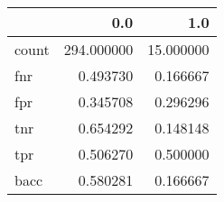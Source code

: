 \begin{tabular}{lrr}
\toprule
{} &         0.0 &        1.0 \\
\midrule
count &  294.000000 &  15.000000 \\
fnr   &    0.493730 &   0.166667 \\
fpr   &    0.345708 &   0.296296 \\
tnr   &    0.654292 &   0.148148 \\
tpr   &    0.506270 &   0.500000 \\
bacc  &    0.580281 &   0.166667 \\
\bottomrule
\end{tabular}
